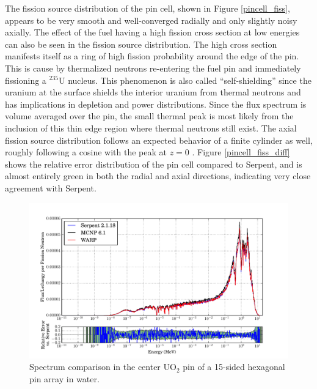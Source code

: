 The fission source distribution of the pin cell, shown in Figure \ref{pincell_fiss}, appears to be very smooth and well-converged radially and only slightly noisy axially.  The effect of the fuel having a high fission cross section at low energies can also be seen in the fission source distribution.  The high cross section manifests itself as a ring of high fission probability around the edge of the pin.  This is cause by thermalized neutrons re-entering the fuel pin and immediately fissioning a $^{235}$U nucleus.  This phenomenon is also called ``self-shielding'' since the uranium at the surface shields the interior uranium from thermal neutrons and has implications in depletion and power distributions.  Since the flux spectrum is volume averaged over the pin, the small thermal peak is most likely from the inclusion of this thin edge region where thermal neutrons still exist.  The axial fission source distribution follows an expected behavior of a finite cylinder as well, roughly following a cosine with the peak at $z=0$ \cite{duderstadt}.  Figure \ref{pincell_fiss_diff} shows the relative error distribution of the pin cell compared to Serpent, and is almost entirely green in both the radial and axial directions, indicating very close agreement with Serpent.

\begin{figure}[h!] 
\centering
\includegraphics[width=\textwidth,trim= 1cm 0cm 1cm 0cm]{graphics/finalresults/assembly_spec-6.pdf}
\caption{Spectrum comparison in the center UO$_2$ pin of a 15-sided hexagonal pin array in water. \label{assembly_spec} }
\end{figure}

